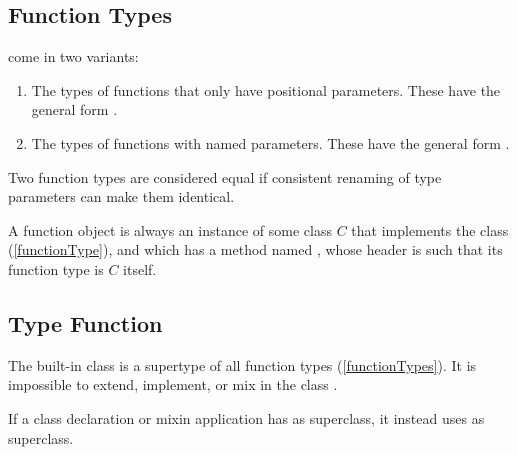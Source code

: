 \documentclass[makeidx]{article}
\begin{document}
\subsection{Function Types}

\LMHash{}%
come in two variants:
\begin{enumerate}
\item
  The types of functions that only have positional parameters.
  These have the general form
  .
\item
  The types of functions with named parameters.
  These have the general form
  .
\end{enumerate}


\LMHash{}%
Two function types are considered equal if consistent renaming of type
parameters can make them identical.


\LMHash{}%
A function object is always an instance of some class $C$ that implements
the class \FUNCTION{} (\ref{functionType}),
and which has a method named \CALL,
whose header is such that its function type is $C$ itself.


\subsection{Type Function}

\LMHash{}%
The built-in class \FUNCTION{} is a supertype of all function types
(\ref{functionTypes}).
It is impossible to extend, implement, or mix in the class \FUNCTION.

\LMHash{}%
If a class declaration or mixin application has \FUNCTION{} as superclass,
it instead uses  as superclass.
\end{document}
